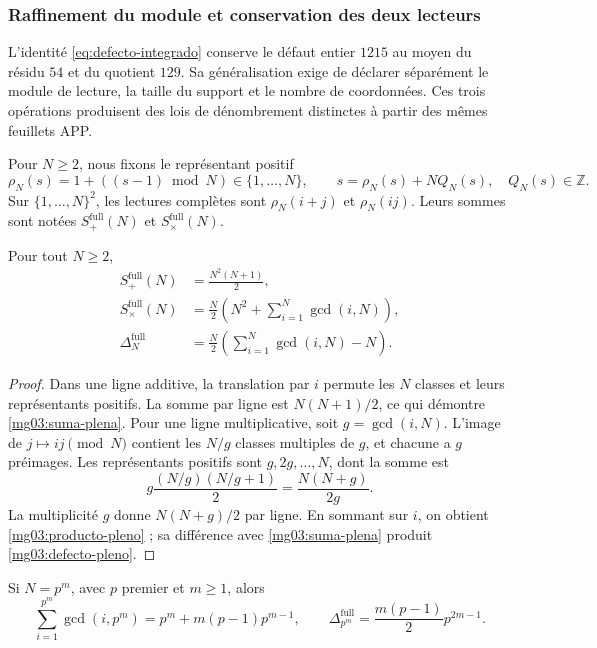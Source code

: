 \subsubsection{Raffinement du module et conservation des deux lecteurs}
\label{mg03:refinamiento}

L'identité \eqref{eq:defecto-integrado} conserve le défaut entier
\(1215\) au moyen du résidu \(54\) et du quotient \(129\). Sa
généralisation exige de déclarer séparément le module de lecture,
la taille du support et le nombre de coordonnées. Ces trois opérations
produisent des lois de dénombrement distinctes à partir des mêmes feuillets APP.

Pour \(N\geq2\), nous fixons le représentant positif
\[
 \rho_N(s)=1+((s-1)\bmod N)\in\{1,\ldots,N\},
 \qquad s=\rho_N(s)+NQ_N(s),\quad Q_N(s)\in\mathbb Z.
\]
Sur \(\{1,\ldots,N\}^2\), les lectures complètes sont
\(\rho_N(i+j)\) et \(\rho_N(ij)\). Leurs sommes sont notées
\(S_+^{\mathrm{full}}(N)\) et \(S_\times^{\mathrm{full}}(N)\).

\begin{proposition}
Pour tout \(N\geq2\),
\begin{align}
 S_+^{\mathrm{full}}(N)&=\frac{N^2(N+1)}2,
 \label{mg03:suma-plena}\\
 S_\times^{\mathrm{full}}(N)&=
 \frac N2\left(N^2+\sum_{i=1}^{N}\gcd(i,N)\right),
 \label{mg03:producto-pleno}\\
 \Delta_N^{\mathrm{full}}&=
 \frac N2\left(\sum_{i=1}^{N}\gcd(i,N)-N\right).
 \label{mg03:defecto-pleno}
\end{align}
\end{proposition}

\begin{proof}
Dans une ligne additive, la translation par \(i\) permute les \(N\) classes et leurs représentants positifs. La somme par ligne est \(N(N+1)/2\), ce qui démontre \eqref{mg03:suma-plena}. Pour une ligne multiplicative, soit \(g=\gcd(i,N)\). L'image de \(j\mapsto ij\pmod N\) contient les \(N/g\) classes multiples de \(g\), et chacune a \(g\) préimages. Les représentants positifs sont \(g,2g,\ldots,N\), dont la somme est
\[
 g\frac{(N/g)(N/g+1)}2=\frac{N(N+g)}{2g}.
\]
La multiplicité \(g\) donne \(N(N+g)/2\) par ligne. En sommant sur
\(i\), on obtient \eqref{mg03:producto-pleno} ; sa différence avec
\eqref{mg03:suma-plena} produit \eqref{mg03:defecto-pleno}.
\end{proof}

\begin{corollary}
Si \(N=p^m\), avec \(p\) premier et \(m\geq1\), alors
\begin{equation}
 \sum_{i=1}^{p^m}\gcd(i,p^m)
 =p^m+m(p-1)p^{m-1},\qquad
 \Delta_{p^m}^{\mathrm{full}}
 =\frac{m(p-1)}2p^{2m-1}.
 \label{mg03:primo-potencia}
\end{equation}
\end{corollary}

